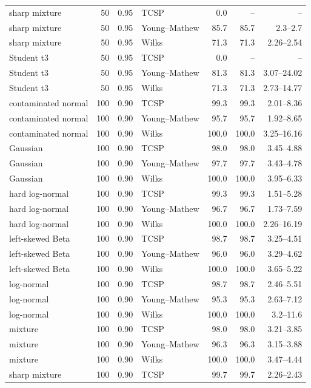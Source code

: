 \begin{longtable}{@{}p{}rrp{}rrr@{}}
sharp mixture & 50 & 0.95 & TCSP & 0.0 & -- & -- \\
sharp mixture & 50 & 0.95 & Young--Mathew & 85.7 & 85.7 & 2.3--2.7 \\
sharp mixture & 50 & 0.95 & Wilks & 71.3 & 71.3 & 2.26--2.54 \\
Student t3 & 50 & 0.95 & TCSP & 0.0 & -- & -- \\
Student t3 & 50 & 0.95 & Young--Mathew & 81.3 & 81.3 & 3.07--24.02 \\
Student t3 & 50 & 0.95 & Wilks & 71.3 & 71.3 & 2.73--14.77 \\
contaminated normal & 100 & 0.90 & TCSP & 99.3 & 99.3 & 2.01--8.36 \\
contaminated normal & 100 & 0.90 & Young--Mathew & 95.7 & 95.7 & 1.92--8.65 \\
contaminated normal & 100 & 0.90 & Wilks & 100.0 & 100.0 & 3.25--16.16 \\
Gaussian & 100 & 0.90 & TCSP & 98.0 & 98.0 & 3.45--4.88 \\
Gaussian & 100 & 0.90 & Young--Mathew & 97.7 & 97.7 & 3.43--4.78 \\
Gaussian & 100 & 0.90 & Wilks & 100.0 & 100.0 & 3.95--6.33 \\
hard log-normal & 100 & 0.90 & TCSP & 99.3 & 99.3 & 1.51--5.28 \\
hard log-normal & 100 & 0.90 & Young--Mathew & 96.7 & 96.7 & 1.73--7.59 \\
hard log-normal & 100 & 0.90 & Wilks & 100.0 & 100.0 & 2.26--16.19 \\
left-skewed Beta & 100 & 0.90 & TCSP & 98.7 & 98.7 & 3.25--4.51 \\
left-skewed Beta & 100 & 0.90 & Young--Mathew & 96.0 & 96.0 & 3.29--4.62 \\
left-skewed Beta & 100 & 0.90 & Wilks & 100.0 & 100.0 & 3.65--5.22 \\
log-normal & 100 & 0.90 & TCSP & 98.7 & 98.7 & 2.46--5.51 \\
log-normal & 100 & 0.90 & Young--Mathew & 95.3 & 95.3 & 2.63--7.12 \\
log-normal & 100 & 0.90 & Wilks & 100.0 & 100.0 & 3.2--11.6 \\
mixture & 100 & 0.90 & TCSP & 98.0 & 98.0 & 3.21--3.85 \\
mixture & 100 & 0.90 & Young--Mathew & 96.3 & 96.3 & 3.15--3.88 \\
mixture & 100 & 0.90 & Wilks & 100.0 & 100.0 & 3.47--4.44 \\
sharp mixture & 100 & 0.90 & TCSP & 99.7 & 99.7 & 2.26--2.43 \\

\end{longtable}
